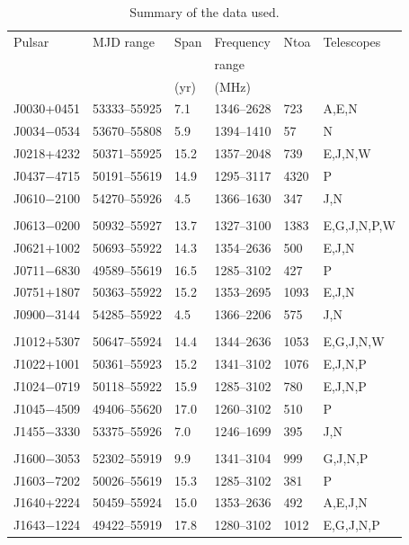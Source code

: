 \begin{table}
\caption{Summary of the data used.}\label{tb:summaryTable}
\begin{tabular}{p{1.3cm}lp{0.4cm}llp{1cm}}
\hline
Pulsar & MJD range & Span & Frequency & Ntoa & Telescopes \\
 & & & range \\
  &  & (yr) & (MHz) \\
\hline
J0030+0451 & 53333--55925  & 7.1  & 1346--2628  & 723  & A,E,N \\
J0034$-$0534 & 53670--55808  & 5.9  & 1394--1410  & 57  & N \\
J0218+4232 & 50371--55925  & 15.2  & 1357--2048  & 739  & E,J,N,W \\
J0437$-$4715 & 50191--55619  & 14.9  & 1295--3117  & 4320  & P \\
J0610$-$2100 & 54270--55926  & 4.5  & 1366--1630  & 347  & J,N \\
\\
J0613$-$0200 & 50932--55927  & 13.7  & 1327--3100  & 1383  & E,G,J,N,P,W \\
J0621+1002 & 50693--55922  & 14.3  & 1354--2636  & 500  & E,J,N \\
J0711$-$6830 & 49589--55619  & 16.5  & 1285--3102  & 427  & P \\
J0751+1807 & 50363--55922  & 15.2  & 1353--2695  & 1093  & E,J,N \\
J0900$-$3144 & 54285--55922  & 4.5  & 1366--2206  & 575  & J,N \\
\\
J1012+5307 & 50647--55924  & 14.4  & 1344--2636  & 1053  & E,G,J,N,W \\
J1022+1001 & 50361--55923  & 15.2  & 1341--3102  & 1076  & E,J,N,P \\
J1024$-$0719 & 50118--55922  & 15.9  & 1285--3102  & 780  & E,J,N,P \\
J1045$-$4509 & 49406--55620  & 17.0  & 1260--3102  & 510  & P \\
J1455$-$3330 & 53375--55926  & 7.0  & 1246--1699  & 395  & J,N \\
\\
J1600$-$3053 & 52302--55919  & 9.9  & 1341--3104  & 999  & G,J,N,P \\
J1603$-$7202 & 50026--55619  & 15.3  & 1285--3102  & 381  & P \\
J1640+2224 & 50459--55924  & 15.0  & 1353--2636  & 492  & A,E,J,N \\
J1643$-$1224 & 49422--55919  & 17.8  & 1280--3102  & 1012  & E,G,J,N,P \\

\end{tabular}
\end{table}
